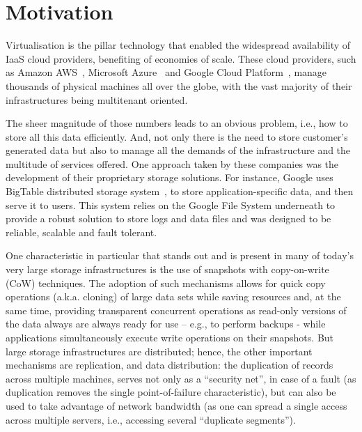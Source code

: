 \section{Motivation} %
\label{sec:intro_motivation}

Virtualisation is the pillar technology that enabled the widespread availability of IaaS cloud providers, benefiting of economies of scale. These cloud providers, such as Amazon AWS~\cite{aws_2017}, Microsoft Azure~\cite{azure_2017} and Google Cloud Platform~\cite{gcp_2017}, manage thousands of physical machines all over the globe, with the vast majority of their infrastructures being multitenant oriented.

The sheer magnitude of those numbers leads to an obvious problem, i.e., how to store all this data efficiently. And, not only there is the need to store customer’s generated data but also to manage all the demands of the infrastructure and the multitude of services offered. One approach taken by these companies was the development of their proprietary storage solutions. For instance, Google uses BigTable distributed storage system~\cite{Chang2006}, to store application-specific data, and then serve it to users. This system relies on the Google File System underneath to provide a robust solution to store logs and data files and was designed to be reliable, scalable and fault tolerant.

One characteristic in particular that stands out and is present in many of today’s very large storage infrastructures is the use of snapshots with copy-on-write (CoW) techniques. The adoption of such mechanisms allows for quick copy operations (a.k.a. cloning) of large data sets while saving resources and, at the same time, providing transparent concurrent operations as read-only versions of the data always are always ready for use – e.g., to perform backups - while applications simultaneously execute write operations on their snapshots. But large storage infrastructures are distributed; hence, the other important mechanisms are replication, and data distribution: the duplication of records across multiple machines, serves not only as a “security net”, in case of a fault (as duplication removes the single point-of-failure characteristic), but can also be used to take advantage of network bandwidth (as one can spread a single access across multiple servers, i.e., accessing several “duplicate segments”).

